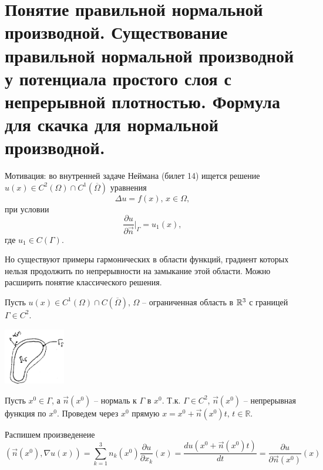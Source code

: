 \section{ Понятие правильной нормальной производной. Существование правильной нормальной производной у потенциала простого слоя с непрерывной плотностью. Формула для скачка для нормальной производной.}
Мотивация: во внутренней задаче Неймана (билет 14) ищется решение $u(x) \in C^2(\Omega) \cap C^1(\overline{\Omega})$ уравнения $$\Delta u = f(x), \, x \in \Omega,$$ при условии $$\frac{\partial u}{\partial \vec{n}}\bigg|_{\Gamma} = u_1(x),$$ где $u_1 \in C(\Gamma)$.

Но существуют примеры гармонических в области функций, градиент которых нельзя продолжить по непрерывности на замыкание этой области. Можно расширить понятие классического решения.

    Пусть $u(x) \in C^1(\Omega) \cap C(\overline{\Omega}), \, \Omega$ -- ограниченная область в $\mathbb{R}^3$ с границей $\Gamma \in C^2$.
\begin{center}
\includegraphics[width=0.2\textwidth]{32_1_new}
\end{center}
Пусть $x^0 \in \Gamma$, а $\vec{n}(x^0)$ -- нормаль к $\Gamma$ в $x^0$. Т.к. $\Gamma \in C^2$, $\vec{n}(x^0)$ -- непрерывная функция по $x^0$. Проведем через $x^0$ прямую $x = x^0 + \vec{n}(x^0)t, \, t \in \mathbb{R}$.

Распишем произведенеие $$(\vec{n}(x^0), \nabla u(x)) = \sum_{k=1}^{3} n_k(x^0)\frac{\partial u}{\partial x_k}(x) = \frac{du(x^0 + \vec{n}(x^0)t)}{dt} = \frac{\partial u}{\partial \vec{n}(x^0)}(x)$$


